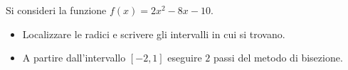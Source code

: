 Si consideri la funzione $f(x)=2x^2-8x-10$.
\begin{itemize}
\item  Localizzare le radici
e scrivere gli intervalli in cui si trovano.
\item A partire
dall'intervallo $[-2,1]$ eseguire $2$ passi del metodo di
bisezione.
\end{itemize}
